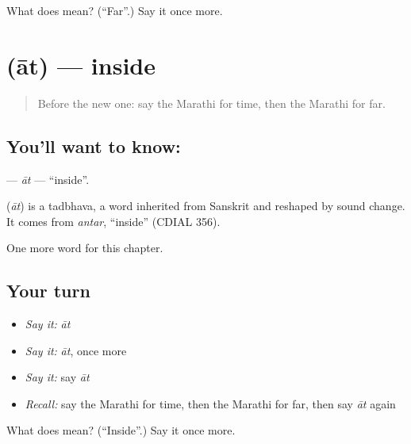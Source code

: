 \begin{tcolorbox}[breakable,colback=teal!4,colframe=teal!35!black,title={Before you move on}]
What does  mean? (\textquotedblleft{}Far\textquotedblright{}.) Say it once more.
\end{tcolorbox}
\section[\texorpdfstring{\mr{आत} (āt)}{आत (āt)}]{ (āt) — inside}

\label{lesson:MR-C112-at}



\begin{quote}
Before the new one: say the Marathi for time, then the Marathi for far.
\end{quote}

\subsection*{You'll want to know: }
\textbf{} — \emph{āt} — \textquotedblleft{}inside\textquotedblright{}.

\begin{cousinweb}
\textbf{} (\emph{āt}) is a tadbhava, a word inherited from Sanskrit and reshaped by sound change. It comes from \emph{antar}, \textquotedblleft{}inside\textquotedblright{} (CDIAL 356).
\end{cousinweb}

\begin{grammarlens}[title={What you've built}]
One more word for this chapter.
\end{grammarlens}

\subsection*{Your turn}
\begin{itemize}
\raggedright
  \item \emph{Say it:} \emph{āt}
  \item \emph{Say it:} \emph{āt}, once more
  \item \emph{Say it:} say \emph{āt}
  \item \emph{Recall:} say the Marathi for time, then the Marathi for far, then say \emph{āt} again
\end{itemize}

\begin{tcolorbox}[breakable,colback=teal!4,colframe=teal!35!black,title={Before you move on}]
What does  mean? (\textquotedblleft{}Inside\textquotedblright{}.) Say it once more.
\end{tcolorbox}
